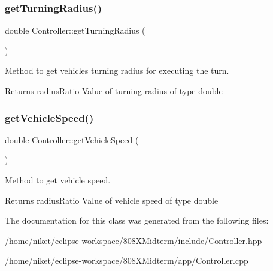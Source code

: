 \subsubsection{\texorpdfstring{get\+Turning\+Radius()}{getTurningRadius()}}
{\footnotesize\ttfamily double Controller\+::get\+Turning\+Radius (\begin{DoxyParamCaption}{ }\end{DoxyParamCaption})}



Method to get vehicle\textquotesingle{}s turning radius for executing the turn. 

\begin{DoxyReturn}{Returns}
radius\+Ratio Value of turning radius of type double 
\end{DoxyReturn}
\mbox{\label{classController_ae20b7417457e0be22da044b3ce4ecc3f}} 
\subsubsection{\texorpdfstring{get\+Vehicle\+Speed()}{getVehicleSpeed()}}
{\footnotesize\ttfamily double Controller\+::get\+Vehicle\+Speed (\begin{DoxyParamCaption}{ }\end{DoxyParamCaption})}



Method to get vehicle speed. 

\begin{DoxyReturn}{Returns}
radius\+Ratio Value of vehicle speed of type double 
\end{DoxyReturn}


The documentation for this class was generated from the following files\+:\begin{DoxyCompactItemize}
\item 
/home/niket/eclipse-\/workspace/808\+X\+Midterm/include/\mbox{\hyperlink{Controller_8hpp}{Controller.\+hpp}}\item 
/home/niket/eclipse-\/workspace/808\+X\+Midterm/app/Controller.\+cpp\end{DoxyCompactItemize}
